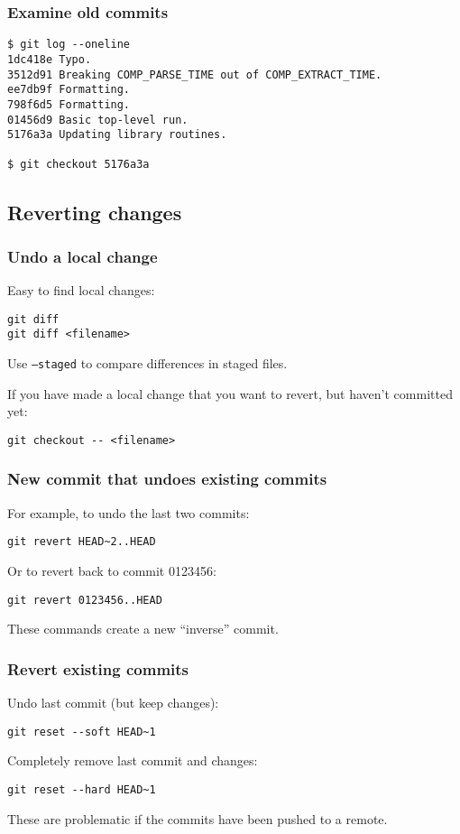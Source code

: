 \documentclass{beamer}
\begin{document}
\begin{frame}[fragile]
  \frametitle{Examine old commits}
  \begin{small}
  \begin{lstlisting}
$ git log --oneline
1dc418e Typo.
3512d91 Breaking COMP_PARSE_TIME out of COMP_EXTRACT_TIME.
ee7db9f Formatting.
798f6d5 Formatting.
01456d9 Basic top-level run.
5176a3a Updating library routines.

$ git checkout 5176a3a
  \end{lstlisting}
  \end{small}
\end{frame}


\subsection{Reverting changes}
\begin{frame}[fragile]
  \frametitle{Undo a local change}
Easy to find local changes:
  \begin{lstlisting}
git diff
git diff <filename>
  \end{lstlisting}
Use {\tt --staged} to compare differences in staged files.

\vspace{1em}

If you have made a local change that you want to revert, but haven't committed yet:
  \begin{lstlisting}
git checkout -- <filename>
  \end{lstlisting}
\end{frame}

\begin{frame}[fragile]
  \frametitle{New commit that undoes existing commits}
For example, to undo the last two commits:
  \begin{lstlisting}
git revert HEAD~2..HEAD
  \end{lstlisting}
Or to revert back to commit 0123456:
  \begin{lstlisting}
git revert 0123456..HEAD
  \end{lstlisting}
These commands create a new ``inverse'' commit.
\end{frame}

\begin{frame}[fragile]
  \frametitle{Revert existing commits}
Undo last commit (but keep changes):
  \begin{lstlisting}
git reset --soft HEAD~1
  \end{lstlisting}
Completely remove last commit and changes:
  \begin{lstlisting}
git reset --hard HEAD~1
  \end{lstlisting}
These are problematic if the commits have been pushed to a remote.
\end{frame}
\end{document}
